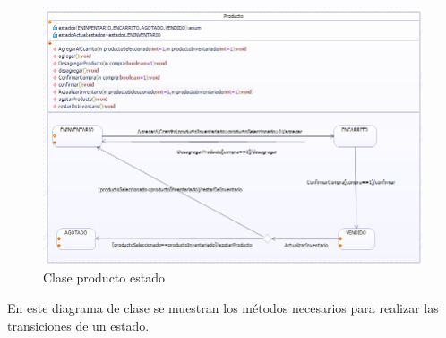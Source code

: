\newpage

\begin{figure}[th!]
	\centering
	\includegraphics[width=1\linewidth]{arquitectura/imagenes/clase_producto_estados}
	\caption{Clase producto estado}
\end{figure}

En este diagrama de clase se muestran los métodos necesarios para realizar las transiciones de un estado.
\newpage






